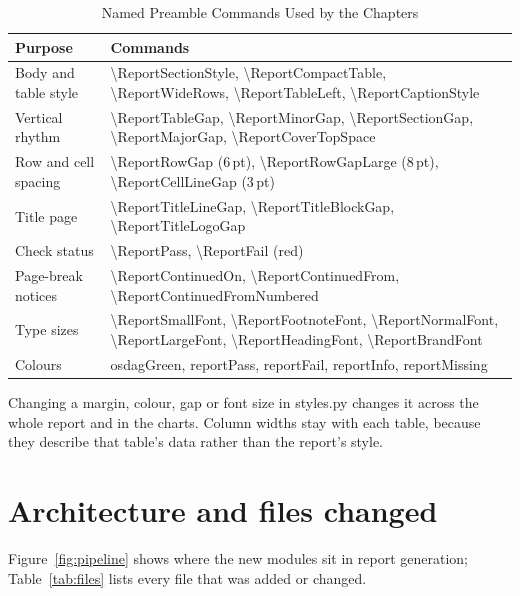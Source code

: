 \documentclass[11pt,a4paper]{article}
\newcommand{\thead}{\rowcolor{headbg}}
\newcommand{\hd}[1]{\sffamily\bfseries\color{ink}#1}
\newcommand{\breakus}{\textunderscore\allowbreak}
\newcommand{\code}[1]{{\ttfamily\let\_\breakus #1}}
\newcommand{\file}[1]{{\ttfamily\let\_\breakus #1}}
\newcommand{\bs}{\textbackslash}
\begin{document}
\begin{table}[!htbp]
\caption{Named Preamble Commands Used by the Chapters}
\small
\begin{tabularx}{\linewidth}{@{}L{3.4cm} Y@{}}
\toprule
\thead \hd{Purpose} & \hd{Commands} \\
\midrule
Body and table style & \code{\bs ReportSectionStyle}, \code{\bs ReportCompactTable}, \code{\bs ReportWideRows},
                       \code{\bs ReportTableLeft}, \code{\bs ReportCaptionStyle} \\
Vertical rhythm      & \code{\bs ReportTableGap}, \code{\bs ReportMinorGap}, \code{\bs ReportSectionGap},
                       \code{\bs ReportMajorGap}, \code{\bs ReportCoverTopSpace} \\
Row and cell spacing & \code{\bs ReportRowGap} (6\,pt), \code{\bs ReportRowGapLarge} (8\,pt), \code{\bs ReportCellLineGap} (3\,pt) \\
Title page           & \code{\bs ReportTitleLineGap}, \code{\bs ReportTitleBlockGap}, \code{\bs ReportTitleLogoGap} \\
Check status         & \code{\bs ReportPass}, \code{\bs ReportFail} (\textcolor{fail}{red}) \\
Page-break notices   & \code{\bs ReportContinuedOn}, \code{\bs ReportContinuedFrom}, \code{\bs ReportContinuedFromNumbered} \\
Type sizes           & \code{\bs ReportSmallFont}, \code{\bs ReportFootnoteFont}, \code{\bs ReportNormalFont},
                       \code{\bs ReportLargeFont}, \code{\bs ReportHeadingFont}, \code{\bs ReportBrandFont} \\
Colours              & \code{osdagGreen}, \code{reportPass}, \code{reportFail}, \code{reportInfo}, \code{reportMissing} \\
\bottomrule
\end{tabularx}
\end{table}

Changing a margin, colour, gap or font size in \file{styles.py} changes it across the whole report and in the charts.
Column widths stay with each table, because they describe that table's data rather than the report's style.

\section{Architecture and files changed}

Figure~\ref{fig:pipeline} shows where the new modules sit in report generation; Table~\ref{tab:files} lists every file that was added or changed.
\end{document}
